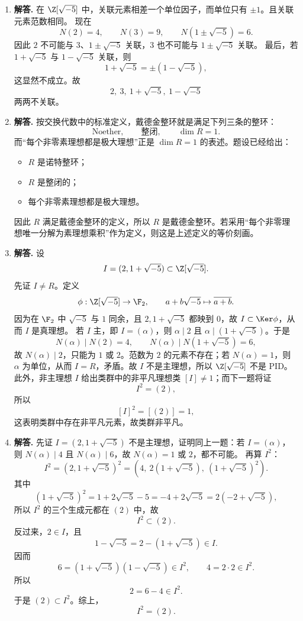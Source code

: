 \begin{enumerate}[label=\textbf{\arabic*.}, leftmargin=*, itemsep=1em]
  \item \textbf{解答.} 在 $\Z[\sqrt{-5}]$ 中，关联元素相差一个单位因子，而单位只有 $\pm1$。且关联元素范数相同。  
  现在
  \[
  N(2)=4,\qquad N(3)=9,\qquad N(1\pm\sqrt{-5})=6.
  \]
  因此 $2$ 不可能与 $3$、$1\pm\sqrt{-5}$ 关联，$3$ 也不可能与 $1\pm\sqrt{-5}$ 关联。  
  最后，若 $1+\sqrt{-5}$ 与 $1-\sqrt{-5}$ 关联，则
  \[
  1+\sqrt{-5}=\pm(1-\sqrt{-5}),
  \]
  这显然不成立。故
  \[
  2,\ 3,\ 1+\sqrt{-5},\ 1-\sqrt{-5}
  \]
  两两不关联。

  \item \textbf{解答.} 按交换代数中的标准定义，戴德金整环就是满足下列三条的整环：  
  \[
  \text{Noether},\qquad \text{整闭},\qquad \dim R=1.
  \]
  而“每个非零素理想都是极大理想”正是 $\dim R=1$ 的表述。题设已经给出：
  \begin{itemize}
    \item $R$ 是诺特整环；
    \item $R$ 是整闭的；
    \item 每个非零素理想都是极大理想。
  \end{itemize}
  因此 $R$ 满足戴德金整环的定义，所以 $R$ 是戴德金整环。若采用“每个非零理想唯一分解为素理想乘积”作为定义，则这是上述定义的等价刻画。

  \item \textbf{解答.} 设
  \[
  I=(2,1+\sqrt{-5})\subset \Z[\sqrt{-5}].
  \]
  先证 $I\neq R$。定义
  \[
  \phi:\Z[\sqrt{-5}]\to \F_2,\qquad a+b\sqrt{-5}\mapsto \overline{a+b}.
  \]
  因为在 $\F_2$ 中 $\sqrt{-5}$ 与 $1$ 同余，且 $2,1+\sqrt{-5}$ 都映到 $0$，故 $I\subset\Ker\phi$，从而 $I$ 是真理想。  
  若 $I$ 主，即 $I=(\alpha)$，则 $\alpha\mid 2$ 且 $\alpha\mid (1+\sqrt{-5})$。于是
  \[
  N(\alpha)\mid N(2)=4,\qquad N(\alpha)\mid N(1+\sqrt{-5})=6,
  \]
  故 $N(\alpha)\mid2$，只能为 $1$ 或 $2$。范数为 $2$ 的元素不存在；若 $N(\alpha)=1$，则 $\alpha$ 为单位，从而 $I=R$，矛盾。故 $I$ 不是主理想，所以 $\Z[\sqrt{-5}]$ 不是 PID。  
  此外，非主理想 $I$ 给出类群中的非平凡理想类 $[I]\neq1$；而下一题将证
  \[
  I^2=(2),
  \]
  所以
  \[
  [I]^2=[(2)]=1,
  \]
  这表明类群中存在非平凡元素，故类群非平凡。

  \item \textbf{解答.} 先证 $I=(2,1+\sqrt{-5})$ 不是主理想，证明同上一题：若 $I=(\alpha)$，则 $N(\alpha)\mid4$ 且 $N(\alpha)\mid6$，故 $N(\alpha)=1$ 或 $2$，都不可能。  
  再算 $I^2$：
  \[
  I^2=(2,1+\sqrt{-5})^2=(4,\ 2(1+\sqrt{-5}),\ (1+\sqrt{-5})^2).
  \]
  其中
  \[
  (1+\sqrt{-5})^2=1+2\sqrt{-5}-5=-4+2\sqrt{-5}=2(-2+\sqrt{-5}),
  \]
  所以 $I^2$ 的三个生成元都在 $(2)$ 中，故
  \[
  I^2\subset (2).
  \]
  反过来，$2\in I$，且
  \[
  1-\sqrt{-5}=2-(1+\sqrt{-5})\in I.
  \]
  因而
  \[
  6=(1+\sqrt{-5})(1-\sqrt{-5})\in I^2,\qquad 4=2\cdot2\in I^2.
  \]
  所以
  \[
  2=6-4\in I^2.
  \]
  于是 $(2)\subset I^2$。综上，
  \[
  I^2=(2).
  \]


\end{enumerate}
